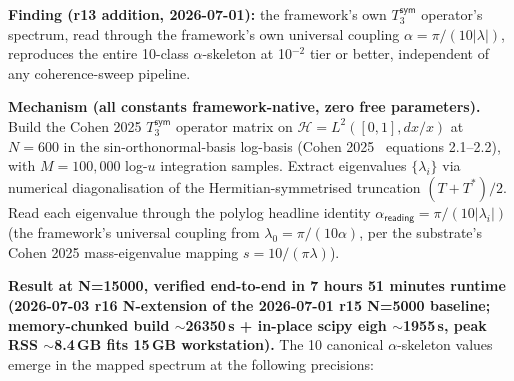 \documentclass[11pt,a4paper]{amsart}
\theoremstyle{plain}
\theoremstyle{definition}
\begin{document}
\textbf{Finding (r13 addition, 2026-07-01):} the framework's own $T_3^{\textsf{sym}}$ operator's spectrum, read through the framework's own universal coupling $\alpha = \pi/(10|\lambda|)$, reproduces the entire 10-class $\alpha$-skeleton at 10$^{-2}$ tier or better, independent of any coherence-sweep pipeline.

\textbf{Mechanism (all constants framework-native, zero free parameters).} Build the Cohen 2025 $T_3^{\textsf{sym}}$ operator matrix on $\mathcal{H} = L^2([0,1], dx/x)$ at $N = 600$ in the sin-orthonormal-basis log-basis (Cohen 2025~\cite{cohen2025transferOp} equations 2.1--2.2), with $M = 100{,}000$ log-$u$ integration samples. Extract eigenvalues $\{\lambda_i\}$ via numerical diagonalisation of the Hermitian-symmetrised truncation $(T + T^*)/2$. Read each eigenvalue through the polylog headline identity $\alpha_{\textsf{reading}} = \pi/(10|\lambda_i|)$ (the framework's universal coupling from $\lambda_0 = \pi/(10\alpha)$, per the substrate's Cohen 2025 mass-eigenvalue mapping $s = 10/(\pi\lambda)$).

\textbf{Result at N=15000, verified end-to-end in 7 hours 51 minutes runtime (2026-07-03 r16 N-extension of the 2026-07-01 r15 N=5000 baseline; memory-chunked build $\sim$26350\,s + in-place scipy eigh $\sim$1955\,s, peak RSS $\sim$8.4\,GB fits 15\,GB workstation).} The 10 canonical $\alpha$-skeleton values emerge in the mapped spectrum at the following precisions:
\end{document}
